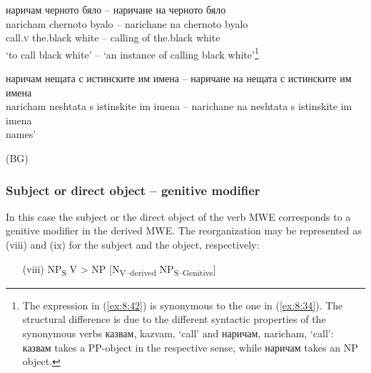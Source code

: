 \documentclass[output=paper]{langsci/langscibook}
\begin{document}
\begin{exe}
\ex \label{ex:8:42}
\settowidth{}
\glll наричам черното бяло -- наричане на черното бяло\\
naricham chernoto byalo -- narichane na chernoto byalo\\
call.\textsc{v} {the.black} white -- calling of  {the.black} white \\  
\glt ‘to call black white’ -- ‘an instance of calling black white’\footnote{ The
expression in (\ref{ex:8:42}) is synonymous to the one in (\ref{ex:8:34}). The structural
difference is due to the different syntactic properties of the
synonymous verbs казвам, kazvam, `call' and наричам, naricham, `call': казвам takes a PP-object in
the respective sense, while наричам takes an NP object.} 
\end{exe}

\noindent\begin{minipage}[t]{\linewidth-3em}%
\begin{exe}
\ex \label{ex:8:43}
\settowidth{}
\gll наричам нещата с истинските им имена --  наричане на нещата с истинските им имена\\
naricham neshtata s istinskite im imena --  narichane na
neshtata s istinskite im imena  \\ %
names’
\end{exe}
\end{minipage}%
\hfill
\noindent\begin{minipage}[t]{2em}%
\vspace*{0.15\baselineskip}
(BG)
\end{minipage}

\subsubsection{Subject or direct object -- genitive modifier}
\label{section632}

In this case the subject or the direct object of the verb MWE
corresponds to a genitive modifier in the derived MWE. The
reorganization may be represented as (viii) and (ix) for the subject
and the object, respectively:



\renewcommand{\theenumi}{(\roman{enumi})}%
\begin{enumerate}
 \setcounter{enumi}{7}
\item[(viii)]  NP\textsubscript{S} V > NP [N\textsubscript{V–derived}
NP\textsubscript{S–Genitive}]
\end{enumerate}
\end{document}
